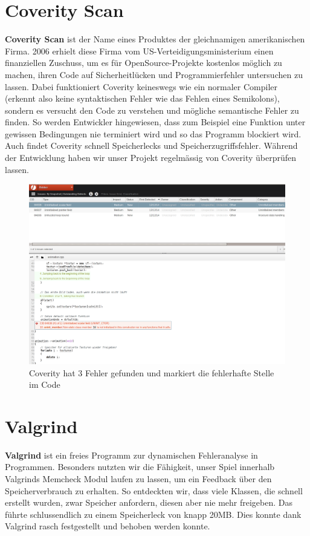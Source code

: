 \documentclass[11pt,a4paper]{scrbook}
\begin{document}
\section{Coverity Scan}
\textbf{Coverity Scan} ist der Name eines Produktes der gleichnamigen amerikanischen Firma. 2006 erhielt diese Firma vom US-Verteidigungsministerium
einen finanziellen Zuschuss, um es für OpenSource-Projekte kostenlos möglich zu machen, ihren Code auf Sicherheitlücken und Programmierfehler untersuchen
zu lassen. Dabei funktioniert Coverity keineswegs wie ein normaler Compiler (erkennt also keine syntaktischen Fehler wie das Fehlen eines Semikolons),
sondern es versucht den Code zu verstehen und mögliche semantische Fehler zu finden. So werden Entwickler hingewiesen, dass zum Beispiel eine Funktion
unter gewissen Bedingungen nie terminiert wird und so das Programm blockiert wird. Auch findet Coverity schnell Speicherlecks und Speicherzugriffsfehler.
Während der Entwicklung haben wir unser Projekt regelmässig von Coverity überprüfen lassen.
\begin{figure}
\centering
\includegraphics[scale=0.4]{img/coverity.png}
\caption{Coverity hat 3 Fehler gefunden und markiert die fehlerhafte Stelle im Code}
\end{figure}

\section{Valgrind}
\textbf{Valgrind} ist ein freies Programm zur dynamischen Fehleranalyse in Programmen. Besonders nutzten wir die Fähigkeit,
unser Spiel innerhalb Valgrinds Memcheck Modul laufen zu lassen, um ein Feedback über den Speicherverbrauch zu erhalten. So entdeckten
wir, dass viele Klassen, die schnell erstellt wurden, zwar Speicher anfordern, diesen aber nie mehr freigeben.
Das führte schlussendlich zu einem Speicherleck von knapp 20MB. Dies konnte dank Valgrind rasch festgestellt und behoben werden konnte.
\end{document}
